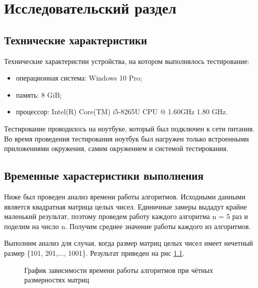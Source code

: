 \chapter{Исследовательский раздел}
\section{Технические характеристики}
Технические характеристии устройства, на котором выполнялось тестирование:
\begin{itemize}
	\item операционная система: Windows 10 Pro;
	\item память: 8 GiB;
	\item процессор: Intel(R) Core(TM) i5-8265U CPU @ 1.60GHz   1.80 GHz.
\end{itemize}
Тестирование проводилось на ноутбуке, который был подключен к сети питания. Во время проведения тестирования ноутбук был нагружен только встроенными приложениями окружения, самим окружением и системой тестирования.

\section{Временные харастеристики выполнения}
Ниже был проведен анализ времени работы алгоритмов. Исходными данными является квадратная матрица целых чисел. Единичные замеры выдадут крайне маленький результат, поэтому  проведем работу каждого алгоритма n = 5 раз и поделим на число n. Получим среднее значение работы каждого из алгоритмов. 

Выполним анализ для случая, когда размер матриц целых чисел имеет нечетный размер \{101, 201,..., 1001\}. Результат приведен на рис \ref{fg:6_1}.

\begin{figure}[H]
	\centering
	\caption{График зависимости времени работы алгоритмов при чётных размерностях матриц} 
	\label{fg:6_1}
\end{figure}

